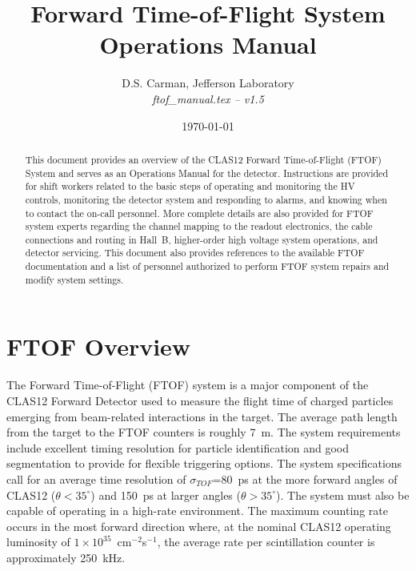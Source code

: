 \documentclass[12pt]{article}
\begin{document}
\title{Forward Time-of-Flight System Operations Manual}

\vskip 0.5cm

\author{D.S. Carman, Jefferson Laboratory\\[0.2ex]
{\it ftof\_manual.tex -- v1.5}}

\date \today
%
\maketitle

\begin{abstract}
This document provides an overview of the CLAS12 Forward Time-of-Flight (FTOF) System and serves 
as an Operations Manual for the detector. Instructions are provided for shift workers related to 
the basic steps of operating and monitoring the HV controls, monitoring the detector system and 
responding to alarms, and knowing when to contact the on-call personnel. More complete details 
are also provided for FTOF system experts regarding the channel mapping to the readout electronics, 
the cable connections and routing in Hall~B, higher-order high voltage system operations, and 
detector servicing. This document also provides references to the available FTOF documentation 
and a list of personnel authorized to perform FTOF system repairs and modify system settings.
\end{abstract}

\thispagestyle{empty}

\clearpage

\vfil
\eject

\tableofcontents

\vfil
\eject

\section{FTOF Overview}
\label{intro}

The Forward Time-of-Flight (FTOF) system is a major component of the CLAS12 Forward Detector used 
to measure the flight time of charged particles emerging from beam-related interactions in the 
target. The average path length from the target to the FTOF counters is roughly 7~m. The system
requirements include excellent timing resolution for particle identification and good segmentation 
to provide for flexible triggering options. The system specifications call for an average time 
resolution of $\sigma_{TOF}$=80~ps at the more forward angles of CLAS12 ($\theta < 35^\circ$) and 
150~ps at larger angles ($\theta > 35^\circ$). The system must also be capable of operating in a 
high-rate environment. The maximum counting rate occurs in the most forward direction where, at the 
nominal CLAS12 operating luminosity of $1 \times 10^{35}$~cm$^{-2}$s$^{-1}$, the average rate per 
scintillation counter is approximately 250~kHz.
\end{document}
